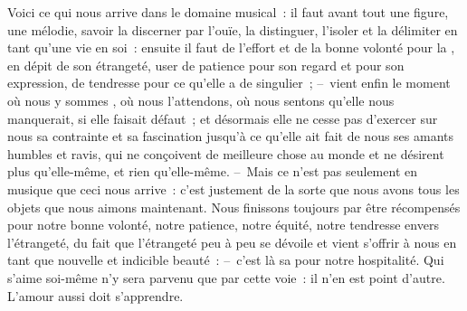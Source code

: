 \documentclass[11pt,twoside,openany]{book}
\newenvironment{lateiDocument}{}{}
\begin{document}
\begin{lateiDocument}
\begin{teiElement}[name={TEI},change={commons\_edition}]
\begin{teiElement}[name={text},type={book},xmlid={book}]
\begin{teiElement}[name={group},type={book},xmlid={book-001}]
\begin{teiElement}[name={group},type={section1},xmlid={section1-003}]
\begin{teiElement}
\begin{teiElement}[name={body},xmlid={body-013}]
\begin{teiDiv}[type={section1},xmlid={div03-8}]
\begin{teiCit}[xmlid={cit11-2}]
                \begin{teiQuote}
Voici ce qui nous arrive dans le domaine musical : il faut avant tout  une figure, une mélodie, savoir la discerner par l’ouïe, la distinguer, l’isoler et la délimiter en tant qu’une vie en soi : ensuite il faut de l’effort et de la bonne volonté pour la , en dépit de son étrangeté, user de patience pour son regard et pour son expression, de tendresse pour ce qu’elle a de singulier ; – vient enfin le moment où nous y sommes , où nous l’attendons, où nous sentons qu’elle nous manquerait, si elle faisait défaut ; et désormais elle ne cesse pas d’exercer sur nous sa contrainte et sa fascination jusqu’à ce qu’elle ait fait de nous ses amants humbles et ravis, qui ne conçoivent de meilleure chose au monde et ne désirent plus qu’elle-même, et rien qu’elle-même. – Mais ce n’est pas seulement en musique que ceci nous arrive : c’est justement de la sorte que nous avons tous les objets que nous aimons maintenant. Nous finissons toujours par être récompensés pour notre bonne volonté, notre patience, notre équité, notre tendresse envers l’étrangeté, du fait que l’étrangeté peu à peu se dévoile et vient s’offrir à nous en tant que nouvelle et indicible beauté : – c’est là sa  pour notre hospitalité. Qui s’aime soi-même n’y sera parvenu que par cette voie : il n’en est point d’autre. L’amour aussi doit s’apprendre.
\end{teiQuote}
              
\end{teiCit}
            
\end{teiDiv}
          
\end{teiElement}
        

\end{teiElement}
\end{teiElement}
\end{teiElement}
\end{teiElement}
\end{teiElement}
\end{lateiDocument}
\end{document}
